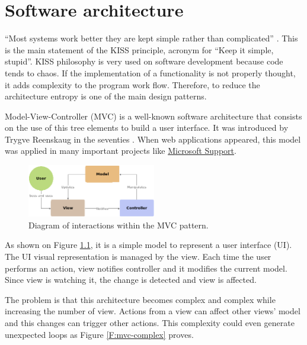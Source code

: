 \chapter{Software architecture}


“Most systems work better they are kept simple rather than complicated”
\cite{kiss-wiki}. This is the main statement of the KISS principle, acronym for
“Keep it simple, stupid”. KISS philosophy is very used on software development
because code tends to chaos. If the implementation of a functionality is not
properly thought, it adds complexity to the program work flow. Therefore, to
reduce the architecture entropy is one of the main design patterns.

Model-View-Controller (MVC) is a well-known software architecture that consists
on the use of this tree elements to build a user interface. It was introduced 
by Trygve Reenskaug in the seventies \cite{mvc-past-present}. When web
applications appeared, this model was applied in many important projects
like \href{https://support.microsoft.com}{Microsoft Support}. 


\begin{figure}[htb]
	\begin{center}
		\includegraphics[width=0.5\textwidth]{./figures/mvc.png}
		\caption{Diagram of interactions within the MVC pattern.
				 \cite{mvc-wiki}}
		\label{F:mvc}
	\end{center}
\end{figure}

As shown on Figure \ref{F:mvc}, it is a simple model to represent
a user interface (UI). The UI visual representation is managed by the view.
Each time the user performs an action, view notifies controller and it modifies
the current model. Since view is watching it, the change is detected and view
is affected.

The problem is that this architecture becomes complex and complex while 
increasing the number of view. Actions from a view can affect other views'
model and this changes can trigger other actions. This complexity could even
generate unexpected loops as Figure \ref{F:mvc-complex} proves.

